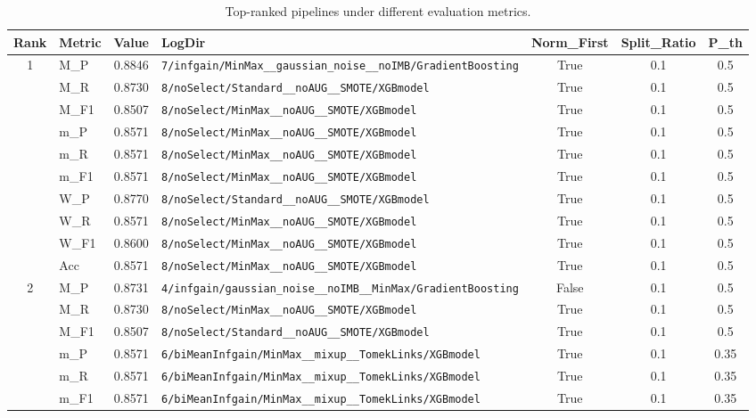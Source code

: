 \begin{table}[htbp]
\caption{Top-ranked pipelines under different evaluation metrics.}
\label{tab:rank_metric_vertical}
\centering
\small
\setlength{\tabcolsep}{4pt}
\begin{tabular}{|c|l|c|>{\ttfamily\footnotesize}p{7.2cm}|c|c|c|}
\hline
Rank & Metric & Value & LogDir & Norm\_First & Split\_Ratio & P\_th \\
\hline
\multirow{10}{*}{1} & M\_P & 0.8846 & \texttt{7/infgain/MinMax\_\_gaussian\_noise\_\_noIMB/GradientBoosting} & True & 0.1 & 0.5 \\
 & M\_R & 0.8730 & \texttt{8/noSelect/Standard\_\_noAUG\_\_SMOTE/XGBmodel} & True & 0.1 & 0.5 \\
 & M\_F1 & 0.8507 & \texttt{8/noSelect/MinMax\_\_noAUG\_\_SMOTE/XGBmodel} & True & 0.1 & 0.5 \\
 & m\_P & 0.8571 & \texttt{8/noSelect/MinMax\_\_noAUG\_\_SMOTE/XGBmodel} & True & 0.1 & 0.5 \\
 & m\_R & 0.8571 & \texttt{8/noSelect/MinMax\_\_noAUG\_\_SMOTE/XGBmodel} & True & 0.1 & 0.5 \\
 & m\_F1 & 0.8571 & \texttt{8/noSelect/MinMax\_\_noAUG\_\_SMOTE/XGBmodel} & True & 0.1 & 0.5 \\
 & W\_P & 0.8770 & \texttt{8/noSelect/Standard\_\_noAUG\_\_SMOTE/XGBmodel} & True & 0.1 & 0.5 \\
 & W\_R & 0.8571 & \texttt{8/noSelect/MinMax\_\_noAUG\_\_SMOTE/XGBmodel} & True & 0.1 & 0.5 \\
 & W\_F1 & 0.8600 & \texttt{8/noSelect/MinMax\_\_noAUG\_\_SMOTE/XGBmodel} & True & 0.1 & 0.5 \\
 & Acc & 0.8571 & \texttt{8/noSelect/MinMax\_\_noAUG\_\_SMOTE/XGBmodel} & True & 0.1 & 0.5 \\
\hline
\multirow{10}{*}{2} & M\_P & 0.8731 & \texttt{4/infgain/gaussian\_noise\_\_noIMB\_\_MinMax/GradientBoosting} & False & 0.1 & 0.5 \\
 & M\_R & 0.8730 & \texttt{8/noSelect/MinMax\_\_noAUG\_\_SMOTE/XGBmodel} & True & 0.1 & 0.5 \\
 & M\_F1 & 0.8507 & \texttt{8/noSelect/Standard\_\_noAUG\_\_SMOTE/XGBmodel} & True & 0.1 & 0.5 \\
 & m\_P & 0.8571 & \texttt{6/biMeanInfgain/MinMax\_\_mixup\_\_TomekLinks/XGBmodel} & True & 0.1 & 0.35 \\
 & m\_R & 0.8571 & \texttt{6/biMeanInfgain/MinMax\_\_mixup\_\_TomekLinks/XGBmodel} & True & 0.1 & 0.35 \\
 & m\_F1 & 0.8571 & \texttt{6/biMeanInfgain/MinMax\_\_mixup\_\_TomekLinks/XGBmodel} & True & 0.1 & 0.35 \\

\end{tabular}
\end{table}
